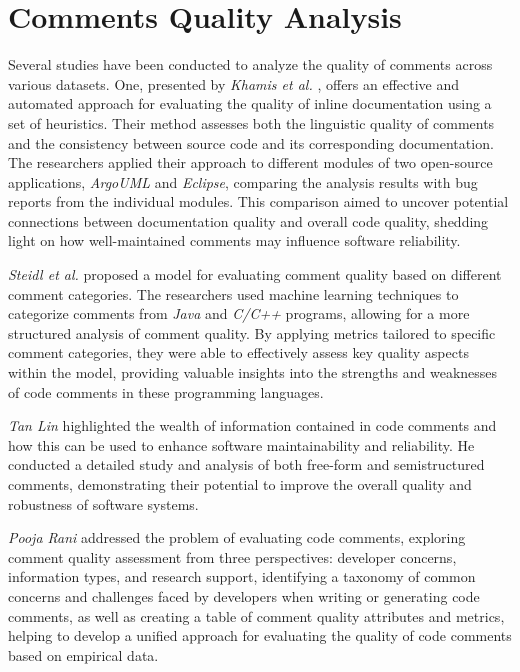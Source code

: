 \section{Comments Quality Analysis}
Several studies have been conducted to analyze the quality of comments across various datasets. One, presented by \textit{Khamis et al.} \cite{javadocMiner}, offers an effective and automated approach for evaluating the quality of inline documentation using a set of heuristics. Their method assesses both the linguistic quality of comments and the consistency between source code and its corresponding documentation. The researchers applied their approach to different modules of two open-source applications, \textit{ArgoUML} and \textit{Eclipse}, comparing the analysis results with bug reports from the individual modules. This comparison aimed to uncover potential connections between documentation quality and overall code quality, shedding light on how well-maintained comments may influence software reliability.

\noindent \textit{Steidl et al.} \cite{steidl2013} proposed a model for evaluating comment quality based on different comment categories. The researchers used machine learning techniques to categorize comments from \textit{Java} and \textit{C/C++} programs, allowing for a more structured analysis of comment quality. By applying metrics tailored to specific comment categories, they were able to effectively assess key quality aspects within the model, providing valuable insights into the strengths and weaknesses of code comments in these programming languages.

\noindent \textit{Tan Lin} \cite{TAN2015493} highlighted the wealth of information contained in code comments and how this can be used to enhance software maintainability and reliability. He conducted a detailed study and analysis of both free-form and semistructured comments, demonstrating their potential to improve the overall quality and robustness of software systems.

\noindent \textit{Pooja Rani} \cite{Rani2021} addressed the problem of evaluating code comments, exploring comment quality assessment from three perspectives: developer concerns, information types, and research support, identifying a taxonomy of common concerns and challenges faced by developers when writing or generating code comments, as well as creating a table of comment quality attributes and metrics, helping to develop a unified approach for evaluating the quality of code comments based on empirical data.

